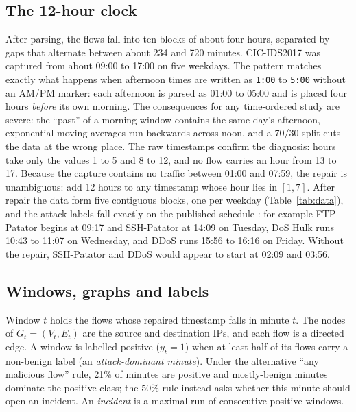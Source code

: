 \documentclass[journal,10pt,twocolumn]{IEEEtran}
\begin{document}
\subsection{The 12-hour clock}
After parsing, the flows fall into ten blocks of about four hours, separated by gaps that alternate between about 234 and 720 minutes. CIC-IDS2017 was captured from about 09:00 to 17:00 on five weekdays. The pattern matches exactly what happens when afternoon times are written as \texttt{1:00} to \texttt{5:00} without an AM/PM marker: each afternoon is parsed as 01:00 to 05:00 and is placed four hours \emph{before} its own morning. The consequences for any time-ordered study are severe: the ``past'' of a morning window contains the same day's afternoon, exponential moving averages run backwards across noon, and a 70/30 split cuts the data at the wrong place. The raw timestamps confirm the diagnosis: hours take only the values 1 to 5 and 8 to 12, and no flow carries an hour from 13 to 17. Because the capture contains no traffic between 01:00 and 07:59, the repair is unambiguous: add 12 hours to any timestamp whose hour lies in $[1,7]$. After repair the data form five contiguous blocks, one per weekday (Table~\ref{tab:data}), and the attack labels fall exactly on the published schedule \cite{sharafaldin2018cicids}: for example FTP-Patator begins at 09:17 and SSH-Patator at 14:09 on Tuesday, DoS Hulk runs 10:43 to 11:07 on Wednesday, and DDoS runs 15:56 to 16:16 on Friday. Without the repair, SSH-Patator and DDoS would appear to start at 02:09 and 03:56.

\subsection{Windows, graphs and labels}
Window $t$ holds the flows whose repaired timestamp falls in minute $t$. The nodes of $G_t=(V_t,E_t)$ are the source and destination IPs, and each flow is a directed edge. A window is labelled positive ($y_t=1$) when at least half of its flows carry a non-benign label (an \emph{attack-dominant minute}). Under the alternative ``any malicious flow'' rule, 21\% of minutes are positive and mostly-benign minutes dominate the positive class; the 50\% rule instead asks whether this minute should open an incident. An \emph{incident} is a maximal run of consecutive positive windows.
\end{document}
